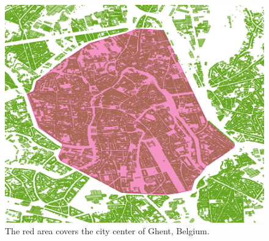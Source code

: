 \begin{figure}[!h]
  \includegraphics[width=\textwidth]{../images/cityCenterGhent.png}
\caption{The red area covers the city center of Ghent, Belgium.}
  \label{fig:ghent}
\end{figure}


